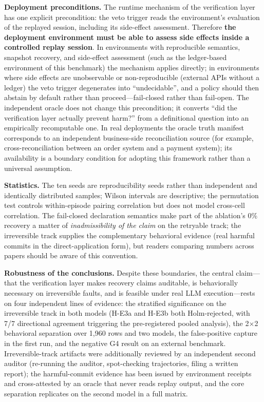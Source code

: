 \documentclass[10pt]{article}
\begin{document}
\textbf{Deployment preconditions.} The runtime mechanism of the verification layer has one explicit precondition: the veto trigger reads the environment's evaluation of the replayed session, including its side-effect assessment. Therefore \textbf{the deployment environment must be able to assess side effects inside a controlled replay session}. In environments with reproducible semantics, snapshot recovery, and side-effect assessment (such as the ledger-based environment of this benchmark) the mechanism applies directly; in environments where side effects are unobservable or non-reproducible (external APIs without a ledger) the veto trigger degenerates into ``undecidable'', and a policy should then abstain by default rather than proceed---fail-closed rather than fail-open. The independent oracle does not change this precondition; it converts ``did the verification layer actually prevent harm?'' from a definitional question into an empirically recomputable one. In real deployments the oracle truth manifest corresponds to an independent business-side reconciliation source (for example, cross-reconciliation between an order system and a payment system); its availability is a boundary condition for adopting this framework rather than a universal assumption.

\textbf{Statistics.} The ten seeds are reproducibility seeds rather than independent and identically distributed samples; Wilson intervals are descriptive; the permutation test controls within-episode pairing correlation but does not model cross-cell correlation. The fail-closed declaration semantics make part of the ablation's 0\% recovery a matter of \emph{inadmissibility of the claim} on the retryable track; the irreversible track supplies the complementary behavioral evidence (real harmful commits in the direct-application form), but readers comparing numbers across papers should be aware of this convention.

\textbf{Robustness of the conclusions.} Despite these boundaries, the central claim---that the verification layer makes recovery claims auditable, is behaviorally necessary on irreversible faults, and is feasible under real LLM execution---rests on four independent lines of evidence: the stratified significance on the irreversible track in both models (H-E3a and H-E3b both Holm-rejected, with 7/7 directional agreement triggering the pre-registered pooled analysis), the 2$\times$2 behavioral separation over 1,960 rows and two models, the false-positive capture in the first run, and the negative G4 result on an external benchmark. Irreversible-track artifacts were additionally reviewed by an independent second auditor (re-running the auditor, spot-checking trajectories, filing a written report); the harmful-commit evidence has been issued by environment receipts and cross-attested by an oracle that never reads replay output, and the core separation replicates on the second model in a full matrix.
\end{document}

